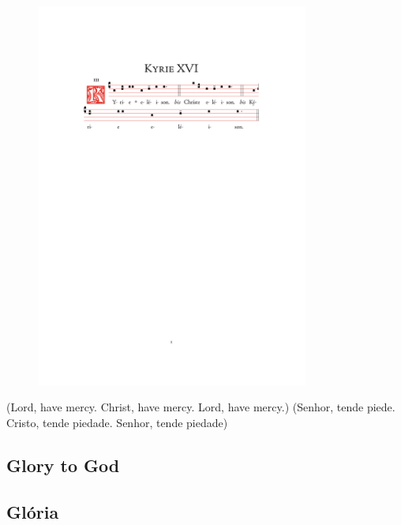 \documentclass[10pt,a5]{article}
\begin{document}
\begin{figure}[h]
	\centering
	\includegraphics[trim = 35mm 200mm 35.5mm 45mm, clip, width = 0.8\textwidth]{scores/Kyrie-XVI.pdf}
\end{figure}

\begin{paracol}{2}

(Lord, have mercy. Christ, have mercy. Lord, have mercy.)
\switchcolumn
(Senhor, tende piede. Cristo, tende piedade. Senhor, tende piedade)

\switchcolumn*

\subsection*{Glory to God}

\switchcolumn

\subsection*{Gl\'oria}

\end{paracol}
\end{document}
